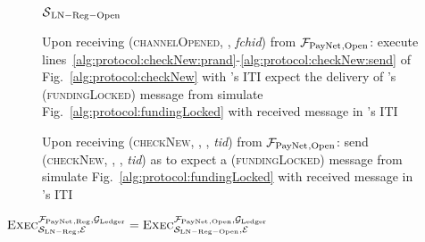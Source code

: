 \begin{figure}[H]
\begin{simulatorbox}{$\mathcal{S}{}_{\mathrm{LN - Reg - Open}}$}
\begin{algorithmic}[1]
      \State Upon receiving (\textsc{channelOpened}, \alice, \textit{fchid})
      from $\mathcal{F}_{\mathrm{PayNet}}{}_{\mathrm{, Open}}$:
      \Indent
        \State execute
        lines~\ref{alg:protocol:checkNew:prand}-\ref{alg:protocol:checkNew:send}
        of Fig.~\ref{alg:protocol:checkNew} with \alice's ITI
          \State expect the delivery of \alice's (\textsc{fundingLocked})
          message from \adversary
          \State simulate Fig.~\ref{alg:protocol:fundingLocked} with
          received message in \bob's ITI
        \EndIf
      \EndIndent
      \Statex

      \State Upon receiving (\textsc{checkNew}, \alice, \bob, \textit{tid})
      from $\mathcal{F}_{\mathrm{PayNet}}{}_{\mathrm{, Open}}$: 
      \Indent
        \State send (\textsc{checkNew}, \alice, \bob, \textit{tid}) as
        \environment{} to \adversary
          \State expect a (\textsc{fundingLocked}) message from \adversary
          \State simulate Fig.~\ref{alg:protocol:fundingLocked} with
          received message in \bob's ITI
        \EndIf
      \EndIndent
    \end{algorithmic}
  \end{simulatorbox}
  \caption{}
  \label{alg:sim:open}
\end{figure}

\begin{lemma}
  \label{lemma:open}
  $\textsc{Exec}^{\mathcal{F}_{\mathrm{PayNet}}{}_{\mathrm{, Reg}},
  \mathcal{G}_{\mathrm{Ledger}}}_{\mathcal{S}_{\mathrm{LN - Reg}}, \mathcal{E}} =
  \textsc{Exec}^{\mathcal{F}_{\mathrm{PayNet}}{}_{\mathrm{, Open}},
  \mathcal{G}_{\mathrm{Ledger}}}_{\mathcal{S}_{\mathrm{LN - Reg - Open}}, \mathcal{E}}$
\end{lemma}

